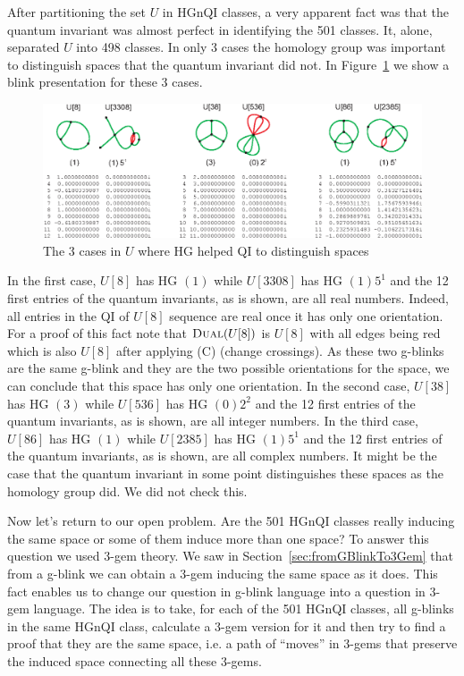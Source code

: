After partitioning the set $U$ in HGnQI classes, a very apparent
fact was that the quantum invariant was almost perfect in
identifying the 501 classes. It, alone, separated $U$ into 498
classes. In only 3 cases the homology group was important to
distinguish spaces that the quantum invariant did not. In
Figure~\ref{fig:qiFailure} we show a blink presentation for
these 3 cases.
\begin{figure}[htp]
   \begin{center}
      \leavevmode
      \includegraphics[width=15cm]{A.figs/qifailure.eps}
   \end{center}
   \vspace{-0.7cm}
   \caption{ The 3 cases in $U$ where HG helped QI to distinguish spaces}
   \label{fig:qiFailure}
\end{figure}
In the first case, $U[8]$ has HG $(1)$
while $U[3308]$ has HG $(1) 5^1$ and the 12 first
entries of the quantum invariants, as is shown,
are all real numbers. Indeed, all entries in the QI of $U[8]$
sequence are real once it has only one orientation.
For a proof of this fact note that
$\textsc{Dual}(U[8])$ is $U[8]$ with
all edges being red which is also $U[8]$ after applying (C)
(change crossings). As these two g-blinks are the same
g-blink and they are the two possible orientations
for the space, we can conclude that this space has only
one orientation. In the second case, $U[38]$ has HG $(3)$
while $U[536]$ has HG $(0) 2^2$ and the 12 first
entries of the quantum invariants, as is shown,
are all integer numbers. In the third case, $U[86]$ has HG $(1)$
while $U[2385]$ has HG $(1) 5^1$ and the 12 first
entries of the quantum invariants, as is shown,
are all complex numbers. It might be the case that
the quantum invariant in some point distinguishes these
spaces as the homology group did. We did not check this.

Now let's return to our open problem. Are the 501 HGnQI
classes really inducing the same space or some of them
induce more than one space? To answer this question we
used 3-gem theory. We saw in Section~\ref{sec:fromGBlinkTo3Gem}
that from a g-blink we can obtain a 3-gem inducing the
same space as it does. This fact enables us to change
our question in g-blink language into a question in 3-gem language. The
idea is to take, for each of the 501 HGnQI classes, all g-blinks
in the same HGnQI class, calculate a 3-gem version for it
and then try to find a proof that they are the same space, i.e.
a path of ``moves'' in 3-gems that preserve the induced space
connecting all these 3-gems.

